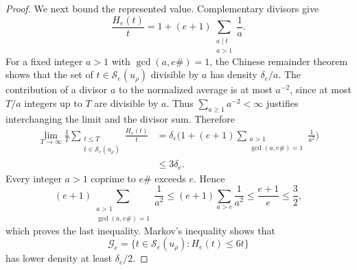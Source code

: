 \documentclass[11pt,letterpaper,reqno]{amsart}
\numberwithin{equation}{section}
\theoremstyle{remark}
\newcommand{\1}{\mathbf 1}
\renewcommand{\leq}{\leqslant}
\renewcommand{\geq}{\geqslant}
\begin{document}
\begin{proof}
We next bound the represented value. Complementary divisors give
\[
 \frac{H_e(t)}t
 =1+(e+1)\sum_{\substack{a\mid t\\a>1}}\frac1a.
\]
For a fixed integer $a>1$ with $\gcd(a,e\#)=1$, the Chinese remainder theorem
shows that the set of $t\in\mathcal{S}_e(u_\rho)$ divisible by $a$ has density
$\delta_e/a$. The contribution of a divisor $a$ to the normalized average is at most
$a^{-2}$, since at most $T/a$ integers up to $T$ are divisible by $a$.
Thus $\sum_{a\geq1}a^{-2}<\infty$ justifies interchanging the limit and
the divisor sum.
Therefore
\begin{align*}
 \lim_{T\to\infty}\frac1T
 \sum_{\substack{t\leq T\\t\in\mathcal{S}_e(u_\rho)}}\frac{H_e(t)}t
 &=\delta_e\bigg(1+(e+1)
 \sum_{\substack{a>1\\\gcd(a,e\#)=1}}\frac1{a^2}\bigg)\\
 &\leq3\delta_e.
\end{align*}
Every integer $a>1$ coprime to $e\#$ exceeds $e$. Hence
\[
 (e+1)\sum_{\substack{a>1\\\gcd(a,e\#)=1}}\frac1{a^2}
 \leq(e+1)\sum_{a>e}\frac1{a^2}
 \leq\frac{e+1}{e}\leq\frac32,
\]
which proves the last inequality. Markov's
inequality shows that
\[
 \mathcal{G}_e=\{t\in\mathcal{S}_e(u_\rho):H_e(t)\leq6t\}
\]
has lower density at least $\delta_e/2$.


\end{proof}
\end{document}
